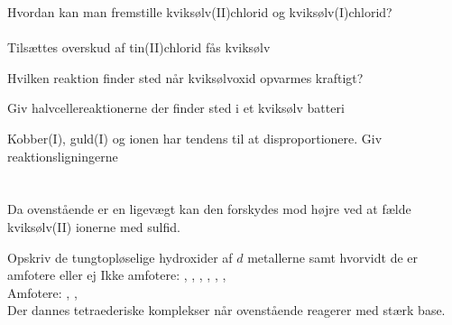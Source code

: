 \begin{flashcard}[Fremstilling]{Hvordan kan man fremstille kviksølv(II)chlorid og kviksølv(I)chlorid?}
\\\vspace*{0.5cm}
\\
Tilsættes overskud af tin(II)chlorid fås kviksølv\\
\end{flashcard}

\begin{flashcard}[Reaktion]{Hvilken reaktion finder sted når kviksølvoxid opvarmes kraftigt?}
\end{flashcard}

\begin{flashcard}[Anvendelse]{Giv halvcellereaktionerne der finder sted i et kviksølv batteri}
\\\vspace*{0.5cm}
\end{flashcard}

\begin{flashcard}[Egenskab]{Kobber(I), guld(I) og  ionen har tendens til at disproportionere. Giv reaktionsligningerne}
\\\vspace*{0.5cm}
\\\vspace*{0.5cm}
\\
Da ovenstående er en ligevægt kan den forskydes mod højre ved at fælde kviksølv(II) ionerne med sulfid.
\end{flashcard}

\begin{flashcard}[Egenskab]{Opskriv de tungtopløselige hydroxider af $d$ metallerne samt hvorvidt de er amfotere eller ej}
Ikke amfotere: , , , , , , \\\vspace*{0.5cm}
Amfotere: , , \\
Der dannes tetraederiske komplekser når ovenstående reagerer med stærk base.
\end{flashcard}